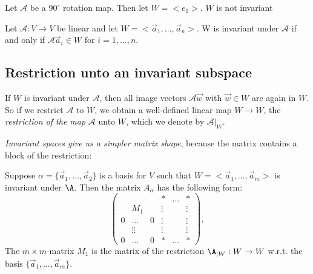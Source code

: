 \begin{example}
    Let $\mathcal{A}$ be a $90^\circ$ rotation map. Then let $W = <e_1>$. $W$ is not invariant
\end{example}

\begin{theorem}
    Let $\mathcal{A}: V \to V$ be linear and let $W = <\vec{a}_1, \dots, \vec{a}_n>$. W is invariant under $\mathcal{A}$ if
    and only if $\mathcal{A}\vec{a}_i \in W$ for $i = 1,\dots,n$.
\end{theorem}

\subsection{Restriction unto an invariant subspace}
\begin{definition}
    If $W$ is invariant under $\mathcal{A}$, then all image vectors $\mathcal{A}\vec{w}$ with $\vec{w} \in W$ are again in $W$.
    So if we restrict $\mathcal{A}$ to $W$, we obtain a well-defined linear map $W \to W$, the \emph{restriction of the map} $\mathcal{A}$
    unto $W$, which we denote by $\mathcal{A}|_W$.
\end{definition}

\emph{Invariant spaces give us a simpler matrix shape}, because the matrix contains a block of the restriction:

\begin{theorem}
    Suppose $\alpha = \{\vec{a}_1, \dots, \vec{a}_2\}$ is a basis for $V$ such that $W = <\vec{a}_1, \dots, \vec{a}_m>$ is invariant under $\A$. Then the matrix $A_\alpha$ has the following form:
    $$\begin{pmatrix} & & & * & \dots & * \\
            & M_1 & &  \vdots & & \vdots \\
        0 & \dots & 0 & \vdots & & \vdots \\
          & \vdots\vdots & & \vdots & & \vdots \\
    0 & \dots & 0 & * & \dots & * \end{pmatrix},$$
    The $m \times m$-matrix $M_1$ is the matrix of the restriction $\A_{|W}: W \to W$ w.r.t. the basis $\{\vec{a}_1, \dots, \vec{a}_m\}$.
\end{theorem}

